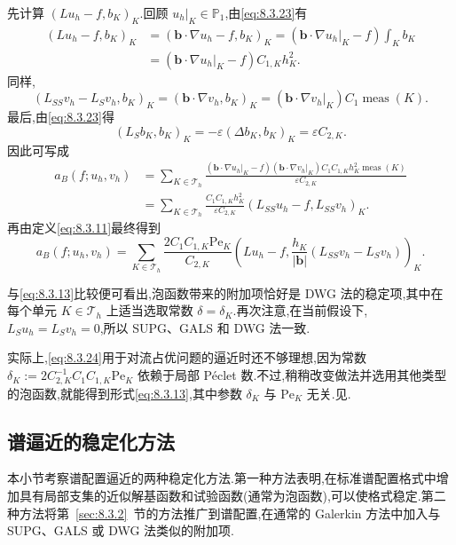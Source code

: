 先计算 \((Lu_h-f,b_K)_K\).回顾 \(u_h|_K\in\mathbb P_1\),由\eqref{eq:8.3.23}有
\[
  \begin{aligned}
    (Lu_h-f,b_K)_K
      &=(\boldsymbol{b}\cdot\nabla u_h-f,b_K)_K
       =(\boldsymbol{b}\cdot\nabla u_h|_K-f)\int_K b_K\\
      &=(\boldsymbol{b}\cdot\nabla u_h|_K-f)C_{1,K}h_K^2.
  \end{aligned}
\]
同样,
\[
  (L_{SS}v_h-L_Sv_h,b_K)_K=(\boldsymbol{b}\cdot\nabla v_h,b_K)_K
    =(\boldsymbol{b}\cdot\nabla v_h|_K)C_1\operatorname{meas}(K).
\]
最后,由\eqref{eq:8.3.23}得
\[
  (L_Sb_K,b_K)_K=-\varepsilon(\Delta b_K,b_K)_K=\varepsilon C_{2,K}.
\]
因此可写成
\[
  \begin{aligned}
    a_B(f;u_h,v_h)
      &=\sum_{K\in\mathcal T_h}
        \frac{(\boldsymbol{b}\cdot\nabla u_h|_K-f)(\boldsymbol{b}\cdot\nabla v_h|_K)
             C_1C_{1,K}h_K^2\operatorname{meas}(K)}{\varepsilon C_{2,K}}\\
      &=\sum_{K\in\mathcal T_h}
        \frac{C_1C_{1,K}h_K^2}{\varepsilon C_{2,K}}(L_{SS}u_h-f,L_{SS}v_h)_K.
  \end{aligned}
\]
再由定义\eqref{eq:8.3.11}最终得到
\begin{equation}\label{eq:8.3.24}
  a_B(f;u_h,v_h)=\sum_{K\in\mathcal T_h}\frac{2C_1C_{1,K}\mathrm{Pe}_K}{C_{2,K}}
      \left(Lu_h-f,\frac{h_K}{|\boldsymbol{b}|}(L_{SS}v_h-L_Sv_h)\right)_K.
\end{equation}

与\eqref{eq:8.3.13}比较便可看出,泡函数带来的附加项恰好是 DWG 法的稳定项,其中在每个单元 \(K\in\mathcal T_h\) 上适当选取常数 \(\delta=\delta_K\).再次注意,在当前假设下,\(L_Su_h=L_Sv_h=0\),所以 SUPG、GALS 和 DWG 法一致.

实际上,\eqref{eq:8.3.24}用于对流占优问题的逼近时还不够理想,因为常数 \(\delta_K:=2C_{2,K}^{-1}C_1C_{1,K}\mathrm{Pe}_K\) 依赖于局部 Péclet 数.不过,稍稍改变做法并选用其他类型的泡函数,就能得到形式\eqref{eq:8.3.13},其中参数 \(\delta_K\) 与 \(\mathrm{Pe}_K\) 无关.见.

\subsection{谱逼近的稳定化方法}\label{sec:8.3.4}

本小节考察谱配置逼近的两种稳定化方法.第一种方法表明,在标准谱配置格式中增加具有局部支集的近似解基函数和试验函数(通常为泡函数),可以使格式稳定.第二种方法将第~\ref{sec:8.3.2}~节的方法推广到谱配置,在通常的 Galerkin 方法中加入与 SUPG、GALS 或 DWG 法类似的附加项.

